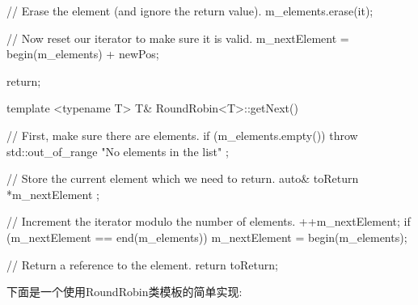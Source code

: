 \begin{cpp}
{{{                // Erase the element (and ignore the return value).
                m_elements.erase(it);

                // Now reset our iterator to make sure it is valid.
                m_nextElement = begin(m_elements) + newPos;

                return;
            }
        }
    }
template <typename T> T& RoundRobin<T>::getNext()
{
    // First, make sure there are elements.
    if (m_elements.empty()) {
        throw std::out_of_range { "No elements in the list" };
    }

    // Store the current element which we need to return.
    auto& toReturn { *m_nextElement };

    // Increment the iterator modulo the number of elements.
    ++m_nextElement;
    if (m_nextElement == end(m_elements)) { m_nextElement = begin(m_elements); }

    // Return a reference to the element.
    return toReturn;
}
\end{cpp}

下面是一个使用RoundRobin类模板的简单实现:


